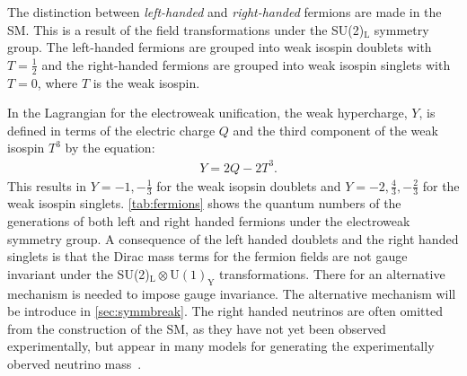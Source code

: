 The distinction between \emph{left-handed} and \emph{right-handed} fermions are made in the SM. This is a result of the field transformations under the SU(2)$_\mathrm{L}$ symmetry group. The left-handed fermions are grouped into weak isospin doublets with $T = \frac{1}{2}$ and the right-handed fermions are grouped into weak isospin singlets with $T = 0$, where $T$ is the weak isospin. 

In the Lagrangian for the electroweak unification, the weak hypercharge, $Y$, is defined in terms of the electric charge $Q$ and the third component of the weak isospin $T^3$ by the equation:
\begin{equation}
    \label{eq:hypercharge}
    \begin{aligned}
        & Y = 2Q - 2T^3.
    \end{aligned}
\end{equation}
This results in $Y = -1, -\frac{1}{3}$ for the weak isopsin doublets and $Y = -2,\frac{4}{3},-\frac{2}{3}$ for the weak isospin singlets. \cref{tab:fermions} shows the quantum numbers of the generations of both left and right handed fermions under the electroweak symmetry group. A consequence of the left handed doublets and the right handed singlets is that the Dirac mass terms for the fermion fields are not gauge invariant under the SU(2)$_\mathrm{L} \otimes \mathrm{U}(1)_\mathrm{Y}$ transformations. There for an alternative mechanism is needed to impose gauge invariance. The alternative mechanism will be introduce in \cref{sec:symmbreak}. The right handed neutrinos are often omitted from the construction of the SM, as they have not yet been observed experimentally, but appear in many models for generating the experimentally oberved neutrino mass~\cite{Ahmad2002}.

